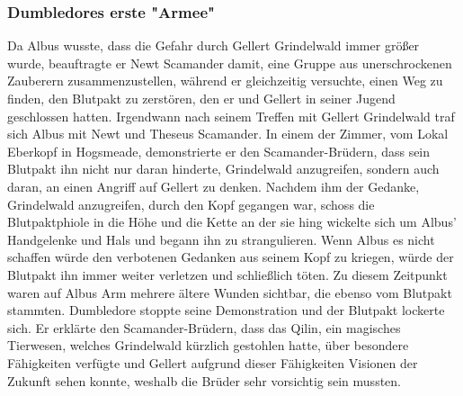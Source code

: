 \documentclass[a4paper, 10pt]{article}
\begin{document}
\subsubsection*{Dumbledores erste "Armee"}
Da Albus wusste, dass die Gefahr durch Gellert Grindelwald immer größer wurde, beauftragte er Newt Scamander damit, eine Gruppe aus unerschrockenen Zauberern zusammenzustellen, während er gleichzeitig versuchte, einen Weg zu finden, den Blutpakt zu zerstören, den er und Gellert in seiner Jugend geschlossen hatten.
\vspace{10pt}
\newline
{}  
Irgendwann nach seinem Treffen mit Gellert Grindelwald traf sich Albus mit Newt und Theseus Scamander. In einem der Zimmer, vom Lokal Eberkopf in Hogsmeade, demonstrierte er den Scamander-Brüdern, dass sein Blutpakt ihn nicht nur daran hinderte, Grindelwald anzugreifen, sondern auch daran, an einen Angriff auf Gellert zu denken. Nachdem ihm der Gedanke,
Grindelwald anzugreifen, durch den Kopf gegangen war, schoss die Blutpaktphiole in die Höhe und die Kette an der sie hing wickelte sich um Albus' Handgelenke und Hals und begann ihn zu strangulieren. Wenn Albus es nicht schaffen würde den verbotenen Gedanken aus seinem Kopf zu kriegen, würde der Blutpakt ihn immer weiter verletzen und schließlich töten. Zu diesem Zeitpunkt waren auf Albus Arm mehrere ältere Wunden sichtbar, die ebenso vom Blutpakt stammten. Dumbledore stoppte seine Demonstration und der Blutpakt lockerte sich. Er erklärte den Scamander-Brüdern, dass das Qilin, ein magisches Tierwesen, welches Grindelwald kürzlich gestohlen hatte, über besondere Fähigkeiten verfügte und Gellert aufgrund dieser Fähigkeiten Visionen der Zukunft sehen konnte, weshalb die Brüder sehr vorsichtig sein mussten.
\vspace{10pt}
\newline
{}  
\end{document}
